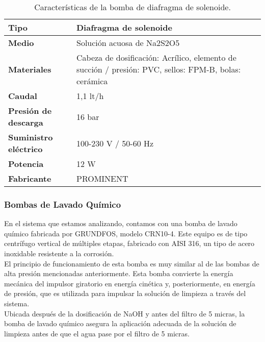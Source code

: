    

\begin{table}[H]
    \centering
    \caption{Características de la bomba de diafragma de solenoide.}
    \label{table:bomba_solenoide}
    \begin{tabular}{| L{5cm} | L{5cm} |}
        \hline
        \textbf{Tipo} & Diafragma de solenoide \\
        \hline
        \textbf{Medio} & Solución acuosa de Na2S2O5 \\
        \hline
        \textbf{Materiales} & Cabeza de dosificación: Acrílico, elemento de succión / presión: PVC, sellos: FPM-B, bolas: cerámica \\
        \hline
        \textbf{Caudal} & 1,1 lt/h \\
        \hline
        \textbf{Presión de descarga} & 16 bar \\
        \hline
        \textbf{Suministro eléctrico} & 100-230 V / 50-60 Hz \\
        \hline
        \textbf{Potencia} & 12 W \\
        \hline
        \textbf{Fabricante} & PROMINENT \\
        \hline
    \end{tabular}
\end{table}

\subsubsection{Bombas de Lavado Químico}

En el sistema que estamos analizando, contamos con una bomba de lavado químico fabricada por GRUNDFOS, modelo CRN10-4. Este equipo es de tipo centrífugo vertical de múltiples etapas, fabricado con AISI 316, un tipo de acero inoxidable resistente a la corrosión.\\

El principio de funcionamiento de esta bomba es muy similar al de las bombas de alta presión mencionadas anteriormente. Esta bomba convierte la energía mecánica del impulsor giratorio en energía cinética y, posteriormente, en energía de presión, que es utilizada para impulsar la solución de limpieza a través del sistema.\\

Ubicada después de la dosificación de NaOH y antes del filtro de 5 micras, la bomba de lavado químico asegura la aplicación adecuada de la solución de limpieza antes de que el agua pase por el filtro de 5 micras.\\

